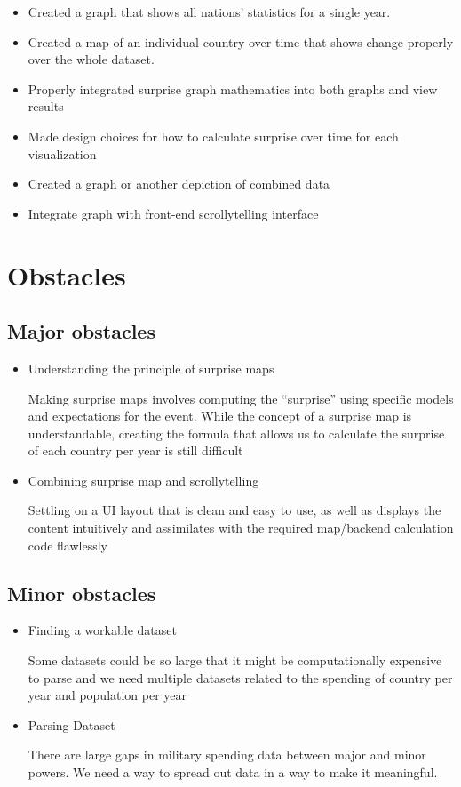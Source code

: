 \documentclass{proc}
\begin{document}
\begin{itemize}
    \item Created a graph that shows all nations’ statistics for a single year.
    \item Created a map of an individual country over time that shows change properly over the whole dataset.
    \item Properly integrated surprise graph mathematics into both graphs and view results
    \item Made design choices for how to calculate surprise over time for each visualization
    \item Created a graph or another depiction of combined data
    \item Integrate graph with front-end scrollytelling interface
\end{itemize}

\section{Obstacles}

\subsection{Major obstacles} %

\begin{itemize}
    \item Understanding the principle of surprise maps

    Making surprise maps involves computing the “surprise” using specific models and expectations for the event. While the concept of a surprise map is understandable, creating the formula that allows us to calculate the surprise of each country per year is still difficult

    \item Combining surprise map and scrollytelling

    Settling on a UI layout that is clean and easy to use, as well as displays the content intuitively and assimilates with the required map/backend calculation code flawlessly

\end{itemize}


\subsection{Minor obstacles}


\begin{itemize}
    \item Finding a workable dataset

    Some datasets could be so large that it might be computationally expensive to parse and we need multiple datasets related to the spending of country per year and population per year 


    \item Parsing Dataset

    There are large gaps in military spending data between major and minor powers. We need a way to spread out data in a way to make it meaningful.

\end{itemize}
\end{document}
